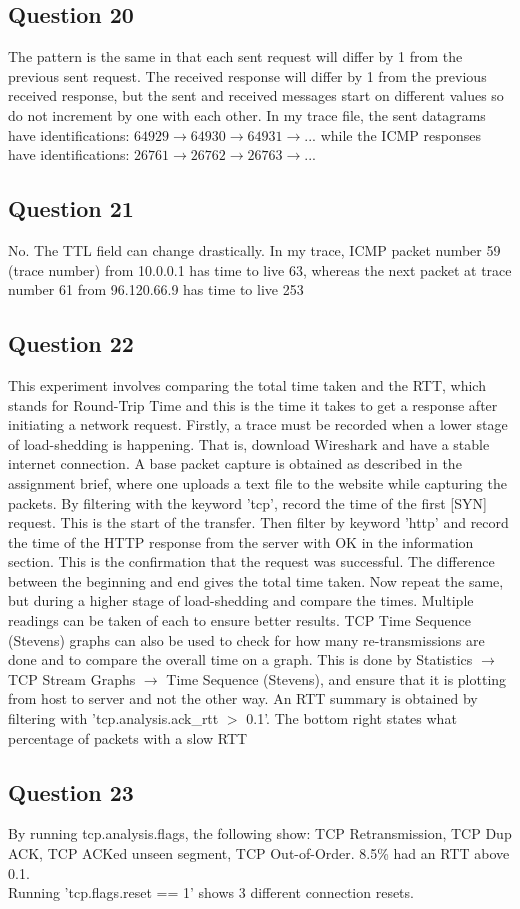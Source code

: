 \documentclass{assignment}
\begin{document}
\subsection{Question 20}
The pattern is the same in that each sent request will differ by 1 from the previous sent request. The received response will differ by 1 from the previous received response, but the sent and received messages start on different values so do not increment by one with each other. In my trace file, the sent datagrams have identifications: $64929 \to 64930 \to 64931 \to ...$ while the ICMP responses have identifications: $26761 \to 26762 \to 26763 \to ...$
\subsection{Question 21}
No. The TTL field can change drastically. In my trace, ICMP packet number 59 (trace number) from 10.0.0.1 has time to live 63, whereas the next packet at trace number 61 from 96.120.66.9 has time to live 253
\subsection{Question 22}
This experiment involves comparing the total time taken and the RTT, which stands for Round-Trip Time and this is the time it takes to get a response after initiating a network request. Firstly, a trace must be recorded when a lower stage of load-shedding is happening. That is, download Wireshark and have a stable internet connection. A base packet capture is obtained as described in the assignment brief, where one uploads a text file to the website while capturing the packets. By filtering with the keyword 'tcp', record the time of the first [SYN] request. This is the start of the transfer. Then filter by keyword 'http' and record the time of the HTTP response from the server with OK in the information section. This is the confirmation that the request was successful. The difference between the beginning and end gives the total time taken. Now repeat the same, but during a higher stage of load-shedding and compare the times. Multiple readings can be taken of each to ensure better results. TCP Time Sequence (Stevens) graphs can also be used to check for how many re-transmissions are done and to compare the overall time on a graph. This is done by Statistics $\to$ TCP Stream Graphs $\to$ Time Sequence (Stevens), and ensure that it is plotting from host to server and not the other way. An RTT summary is obtained by filtering with 'tcp.analysis.ack\_rtt $>$ 0.1'. The bottom right states what percentage of packets with a slow RTT
\subsection{Question 23}
By running tcp.analysis.flags, the following show: TCP Retransmission, TCP Dup ACK, TCP ACKed unseen segment, TCP Out-of-Order. 8.5\% had an RTT above 0.1. \\ Running 'tcp.flags.reset == 1' shows 3 different connection resets.
\end{document}

